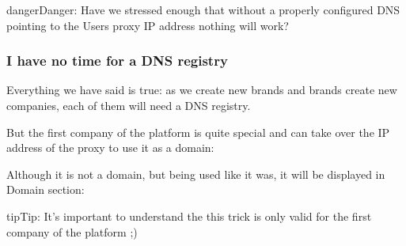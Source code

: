 \documentclass[letterpaper,10pt,english]{sphinxmanual}
\begin{document}
\noindent{}

\begin{notice}{danger}{Danger:}
Have we stressed enough that without a properly configured DNS
pointing to the Users proxy IP address nothing will work?
\end{notice}


\subsubsection{I have no time for a DNS registry}
\label{internal_calls/brand_portal:dnshack}\label{internal_calls/brand_portal:i-have-no-time-for-a-dns-registry}
Everything we have said is true: as we create new brands and brands create new
companies, each of them will need a DNS registry.

But the first company of the platform is quite special and can take over the IP
address of the proxy to use it as a domain:

\noindent{}

Although it is not a domain, but being used like it was, it will be displayed
in Domain section:

\noindent{}

\begin{notice}{tip}{Tip:}
It’s important to understand the this trick is only valid for the first
company of the platform ;)
\end{notice}
\end{document}
